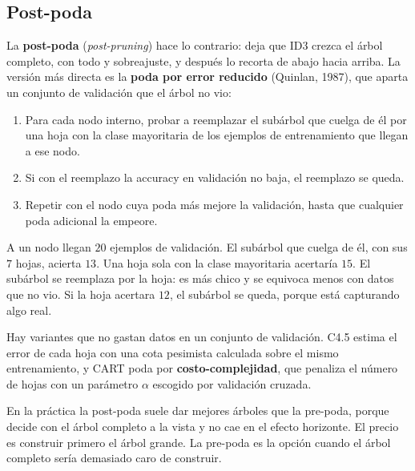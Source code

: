 \documentclass[11pt,letterpaper]{article}
\begin{document}

\subsection*{Post-poda}

La \textbf{post-poda} (\textit{post-pruning}) hace lo contrario: deja
que ID3 crezca el árbol completo, con todo y sobreajuste, y después lo
recorta de abajo hacia arriba. La versión más directa es la
\textbf{poda por error reducido} (Quinlan, 1987), que aparta un
conjunto de validación que el árbol no vio:

\begin{enumerate}[itemsep=0.2em]
    \item Para cada nodo interno, probar a reemplazar el subárbol que
          cuelga de él por una hoja con la clase mayoritaria de los
          ejemplos de entrenamiento que llegan a ese nodo.
    \item Si con el reemplazo la accuracy en validación no baja, el
          reemplazo se queda.
    \item Repetir con el nodo cuya poda más mejore la validación, hasta
          que cualquier poda adicional la empeore.
\end{enumerate}

\begin{ejemplo}
    A un nodo llegan $20$ ejemplos de validación. El subárbol que
    cuelga de él, con sus $7$ hojas, acierta $13$. Una hoja sola con la
    clase mayoritaria acertaría $15$. El subárbol se reemplaza por la
    hoja: es más chico y se equivoca menos con datos que no vio. Si la
    hoja acertara $12$, el subárbol se queda, porque está capturando
    algo real.
\end{ejemplo}

Hay variantes que no gastan datos en un conjunto de validación. C4.5
estima el error de cada hoja con una cota pesimista calculada sobre el
mismo entrenamiento, y CART poda por \textbf{costo-complejidad}, que
penaliza el número de hojas con un parámetro $\alpha$ escogido por
validación cruzada.

\begin{idea}
    En la práctica la post-poda suele dar mejores árboles que la
    pre-poda, porque decide con el árbol completo a la vista y no cae
    en el efecto horizonte. El precio es construir primero el árbol
    grande. La pre-poda es la opción cuando el árbol completo sería
    demasiado caro de construir.
\end{idea}
\end{document}
